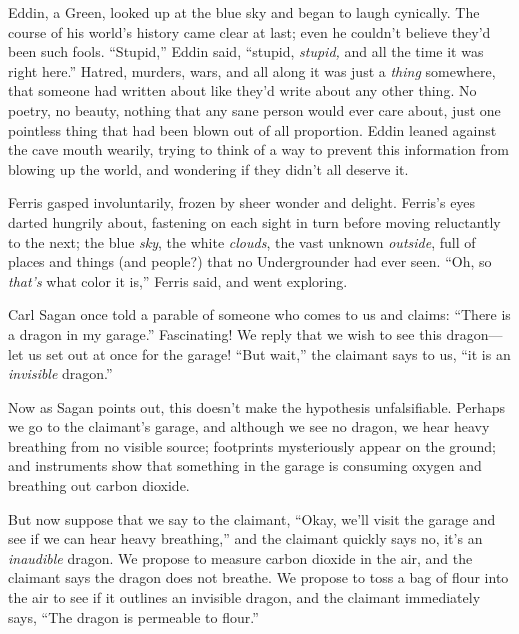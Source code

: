{
 Eddin, a Green, looked up at the blue sky and began to laugh
cynically. The course of his world's history came clear
at last; even he couldn't believe
they'd been such fools.
``Stupid,'' Eddin said,
``stupid, \textit{stupid,} and all the time it was
right here.'' Hatred, murders, wars, and all along it
was just a \textit{thing} somewhere, that someone had written about
like they'd write about any other thing. No poetry, no
beauty, nothing that any sane person would ever care about, just one
pointless thing that had been blown out of all proportion. Eddin leaned
against the cave mouth wearily, trying to think of a way to prevent
this information from blowing up the world, and wondering if they
didn't all deserve it.}

{
 Ferris gasped involuntarily, frozen by sheer wonder and delight.
Ferris's eyes darted hungrily about, fastening on each
sight in turn before moving reluctantly to the next; the blue
\textit{sky}, the white \textit{clouds}, the vast unknown
\textit{outside}, full of places and things (and people?) that no
Undergrounder had ever seen. ``Oh, so
\textit{that's} what color it is,''
Ferris said, and went exploring.}

\myendsectiontext


\bigskip


{
 Carl Sagan once told a parable of someone who comes to us and
claims: ``There is a dragon in my
garage.'' Fascinating! We reply that we wish to see
this dragon---let us set out at once for the garage!
``But wait,'' the claimant says to
us, ``it is an \textit{invisible}
dragon.'' }

{
 Now as Sagan points out, this doesn't make the
hypothesis unfalsifiable. Perhaps we go to the
claimant's garage, and although we see no dragon, we
hear heavy breathing from no visible source; footprints mysteriously
appear on the ground; and instruments show that something in the garage
is consuming oxygen and breathing out carbon dioxide.}

{
 But now suppose that we say to the claimant,
``Okay, we'll visit the garage and see
if we can hear heavy breathing,'' and the claimant
quickly says no, it's an \textit{inaudible} dragon. We
propose to measure carbon dioxide in the air, and the claimant says the
dragon does not breathe. We propose to toss a bag of flour into the air
to see if it outlines an invisible dragon, and the claimant immediately
says, ``The dragon is permeable to
flour.''}

